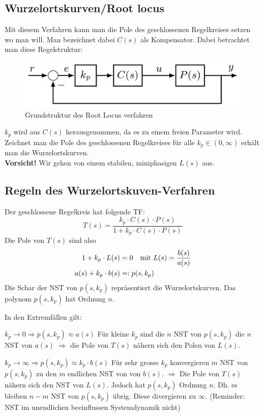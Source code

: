 \subsection{Wurzelortskurven/Root locus}
    Mit diesem Verfahren kann man die Pole des geschlossenen Regelkreises setzen wo man will. Man bezeichnet dabei $C(s)$ als Kompensator. Dabei betrachtet man diese Regelstruktur:
    \begin{figure}[H]
        \centering
        \includegraphics[width = 0.5\linewidth]{images/04/RL_sys.jpeg}
        \caption{Grundstruktur des Root Locus verfahren}
    \end{figure}
    $k_p$ wird aus $C(s)$ herausgenommen, da es zu einem freien Parameter wird. Zeichnet man die Pole des geschlossenen Regelkreises für alle $k_p \in(0,\infty)$ erhält man die Wurzelortskurven.
    \\\textbf{Vorsicht!} Wir gehen von einem stabilen, miniphasigen $L(s)$ aus.
    
\subsection{Regeln des Wurzelortskuven-Verfahren}
    Der geschlossene Regelkreis hat folgende TF:
    \begin{equation*}
        T(s) = \frac{k_p\cdot C(s)\cdot P(s)}{1 + k_p\cdot C(s)\cdot P(s)}
    \end{equation*}
    Die Pole von $T(s)$ sind also
    \begin{align*}
        1 + k_p\cdot L(s) &= 0 \quad\textnormal{mit } L(s) = \frac{b(s)}{a(s)}\\ 
        a(s) + k_p\cdot b(s) &=: p(s,k_p)
    \end{align*}
    Die Schar der NST von $p(s,k_p)$ repräsentiert die Wurzelortskurven. Das polynom $p(s,k_p)$ hat Ordnung $n$.
    
    In den Extremfällen gilt:
    
    $\boxed{k_p \rightarrow 0 \Rightarrow p(s,k_p) \approx a(s)}$ Für kleine $k_p$ sind die $n$ NST von $p(s,k_p)$ die $n$ NST von $a(s)$ $\Rightarrow$ die Pole von $T(s)$ nähern sich den Polen von $L(s)$.
    
    $\boxed{k_p \rightarrow \infty \Rightarrow p(s,k_p) \approx k_p\cdot b(s)}$ Für sehr grosse $k_p$ konvergieren $m$ NST von $p(s,k_p)$ zu den $m$ endlichen NST von von $b(s)$. $\Rightarrow$ Die Pole von $T(s)$ nähern sich den NST von $L(s)$. Jedoch hat $p(s,k_p)$ Ordnung $n$. Dh. es bleiben $n-m$ NST von $p(s,k_p)$ übrig. Diese divergieren zu $\infty$. (Reminder: NST im unendlichen beeinflussen Systemdynamik nicht)
    
